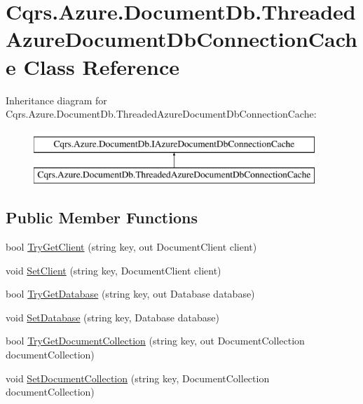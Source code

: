 \hypertarget{classCqrs_1_1Azure_1_1DocumentDb_1_1ThreadedAzureDocumentDbConnectionCache}{}\section{Cqrs.\+Azure.\+Document\+Db.\+Threaded\+Azure\+Document\+Db\+Connection\+Cache Class Reference}
\label{classCqrs_1_1Azure_1_1DocumentDb_1_1ThreadedAzureDocumentDbConnectionCache}
Inheritance diagram for Cqrs.\+Azure.\+Document\+Db.\+Threaded\+Azure\+Document\+Db\+Connection\+Cache\+:\begin{figure}[H]
\begin{center}
\leavevmode
\includegraphics[height=2.000000cm]{classCqrs_1_1Azure_1_1DocumentDb_1_1ThreadedAzureDocumentDbConnectionCache}
\end{center}
\end{figure}
\subsection*{Public Member Functions}
\begin{DoxyCompactItemize}
\item 
bool \hyperlink{classCqrs_1_1Azure_1_1DocumentDb_1_1ThreadedAzureDocumentDbConnectionCache_a0cf4a79ec6bcc1021182f95ddc27edea_a0cf4a79ec6bcc1021182f95ddc27edea}{Try\+Get\+Client} (string key, out Document\+Client client)
\item 
void \hyperlink{classCqrs_1_1Azure_1_1DocumentDb_1_1ThreadedAzureDocumentDbConnectionCache_a4fbbe06abc4c5664243b7be029a4031f_a4fbbe06abc4c5664243b7be029a4031f}{Set\+Client} (string key, Document\+Client client)
\item 
bool \hyperlink{classCqrs_1_1Azure_1_1DocumentDb_1_1ThreadedAzureDocumentDbConnectionCache_a00ea55a85c74b84cfc5f2007e3bc9be3_a00ea55a85c74b84cfc5f2007e3bc9be3}{Try\+Get\+Database} (string key, out Database database)
\item 
void \hyperlink{classCqrs_1_1Azure_1_1DocumentDb_1_1ThreadedAzureDocumentDbConnectionCache_ab3c996b8e717aec1e4fc2a70fea52d53_ab3c996b8e717aec1e4fc2a70fea52d53}{Set\+Database} (string key, Database database)
\item 
bool \hyperlink{classCqrs_1_1Azure_1_1DocumentDb_1_1ThreadedAzureDocumentDbConnectionCache_a0986cecb40fc143751abb4605f507975_a0986cecb40fc143751abb4605f507975}{Try\+Get\+Document\+Collection} (string key, out Document\+Collection document\+Collection)
\item 
void \hyperlink{classCqrs_1_1Azure_1_1DocumentDb_1_1ThreadedAzureDocumentDbConnectionCache_a069d9161ed5649cc3e65cda641d5173d_a069d9161ed5649cc3e65cda641d5173d}{Set\+Document\+Collection} (string key, Document\+Collection document\+Collection)
\end{DoxyCompactItemize}


